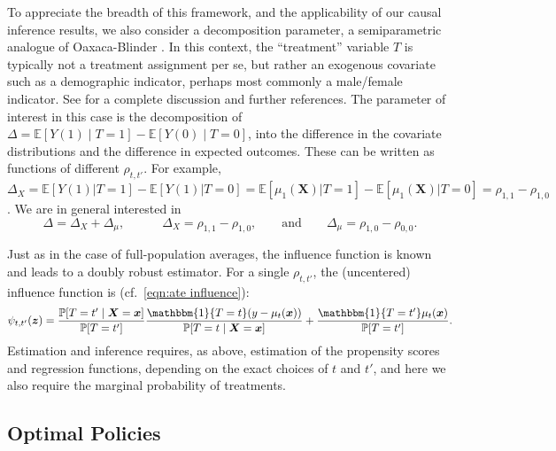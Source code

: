 \documentclass[11pt]{article}
\numberwithin{equation}{section}
\theoremstyle{definition}
\newcommand{\E}{\mathbb{E}}
\renewcommand{\P}{\mathbb{P}}
\newcommand{\One}{\mathbbm{1}}
\newcommand{\bz}{\bm{z}}
\newcommand{\bx}{\bm{x}}
\newcommand{\bX}{\bm{X}}
\begin{document}
To appreciate the breadth of this framework, and the applicability of our causal inference results, we also consider a decomposition parameter, a semiparametric analogue of Oaxaca-Blinder \citep{Kitagawa1955_JASA,Oaxaca1973_IER,Blinder1973_JHR}. In this context, the ``treatment'' variable $T$ is typically not a treatment assignment per se, but rather an exogenous covariate such as a demographic indicator, perhaps most commonly a male/female indicator.  See \cite{Fortin-Lemieux-Firpo2011_handbook} for a complete discussion and further references. The parameter of interest in this case is the decomposition of $\Delta = \E[Y(1) \mid T = 1]  - \E[Y(0) \mid T = 0]$, into the difference in the covariate distributions and the difference in expected outcomes. These can be written as functions of different $\rho_{t,t'}$. For example, $\Delta_X = \E[Y(1) \vert T \!=\! 1]  - \E[Y(1) \vert T \!=\! 0]  = \E[\mu_1(\bX) \vert T \!=\! 1]  - \E[\mu_1(\bX) \vert T \!=\! 0]  = \rho_{1,1} - \rho_{1,0}$. We are in general interested in
\begin{equation}
	\label{eqn:oaxaca}
	\Delta = \Delta_X + \Delta_\mu,   		\qquad \quad  		   \Delta_X = \rho_{1,1} - \rho_{1,0},   		\qquad \text{and} \qquad  		  \Delta_\mu = \rho_{1,0} - \rho_{0,0}.
\end{equation}


Just as in the case of full-population averages, the influence function is known and leads to a doubly robust estimator. For a single $\rho_{t,t'}$, the (uncentered) influence function is (cf.\ \eqref{eqn:ate influence}):
\begin{equation}
	\label{eqn:tot influence}
	\psi_{t,t'}(\bz) =   \frac{\P[T = t' \mid \bX = \bx]}{\P[T = t']} \frac{  \One\{T = t\} ( y - \mu_t(\bx)) }{\P[T = t \mid \bX = \bx]}  +  \frac{\One\{T = t'\} \mu_t(\bx)}{\P[T = t']}.
\end{equation}
Estimation and inference requires, as above, estimation of the propensity scores and regression functions, depending on the exact choices of $t$ and $t'$, and here we also require the marginal probability of treatments.









\subsection{Optimal Policies}
	\label{sec:policy}
	
\end{document}
